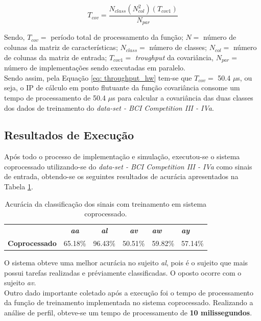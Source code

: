 \begin{equation}
\label{eq: throughput_hw}
T_{cov} = \frac{N_{class}(N_{col}^2)(T_{cov1})}{N_{par}} 
\end{equation}

Sendo, $T_{cov} =$ período total de processamento da função; $N =$ número de colunas da matriz de características; $N_{class} =$ número de classes; $N_{col} =$ número de colunas da matriz de entrada; $T_{cov1} =$ \textit{troughput} da covariância, $N_{par} =$ número de implementações sendo executadas em paralelo.\\
Sendo assim, pela Equação \ref{eq: throughput_hw} tem-se que $T_{cov} =$ 50.4 $\mu$s, ou seja, o IP de cálculo em ponto flutuante da função covariância consome um tempo de processamento de 50.4 $\mu$s para calcular a covariância das duas classes dos dados de treinamento do \textit{data-set - BCI Competition III - IVa}.
\subsection{Resultados de Execução}
Após todo o processo de implementação e simulação, executou-se o sistema coprocessado utilizando-se do \textit{data-set - BCI Competition III - IVa}
como sinais de entrada, obtendo-se os seguintes resultados de acurácia apresentados na Tabela \ref{resacc}.


\begin{table}[!h]
	\centering
	\caption{Acurácia da classificação dos sinais com treinamento em sistema coprocessado.}
	\label{resacc}
	
	\begin{tabular}{lcccll}
		\rowcolor[HTML]{DAE8FC} 
		\multicolumn{1}{c}{\cellcolor[HTML]{DAE8FC}\textbf{Sistema}} & \textit{\textbf{aa}}        & \textit{\textbf{al}}        & \textit{\textbf{av}}        & \textit{\textbf{aw}} & \textit{\textbf{ay}} \\
		\textbf{Coprocessado}                                        & \multicolumn{1}{r}{65.18\%} & \multicolumn{1}{r}{96.43\%} & \multicolumn{1}{r}{50.51\%} & 59.82\%              & 57.14\%             
	\end{tabular}
\end{table}
O sistema obteve uma melhor acurácia no sujeito \textit{al}, pois é o sujeito que mais possui tarefas realizadas e préviamente classificadas. O oposto ocorre com o sujeito \textit{av}.\\
Outro dado importante coletado após a execução foi o tempo de processamento da função de treinamento implementada no sistema coprocessado. Realizando a análise de perfil, obteve-se um tempo de processamento de \textbf{10 milissegundos}.

